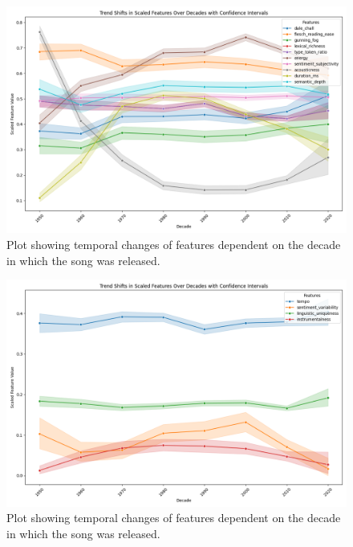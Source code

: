 \begin{center}
\begin{figure}[H]
  \centering
  \includegraphics[width=5in]{img/temporal_trends_2.png}
  \caption{Plot showing temporal changes of features dependent on the decade in
  which the song was released.}
  \label{Figure:fig_eh}
\end{figure}
\end{center}

\begin{center}
\begin{figure}[H]
  \centering
  \includegraphics[width=5in]{img/temporal_trends_3.png}
  \caption{Plot showing temporal changes of features dependent on the decade in
  which the song was released.}
  \label{Figure:fig_eh}
\end{figure}
\end{center}


